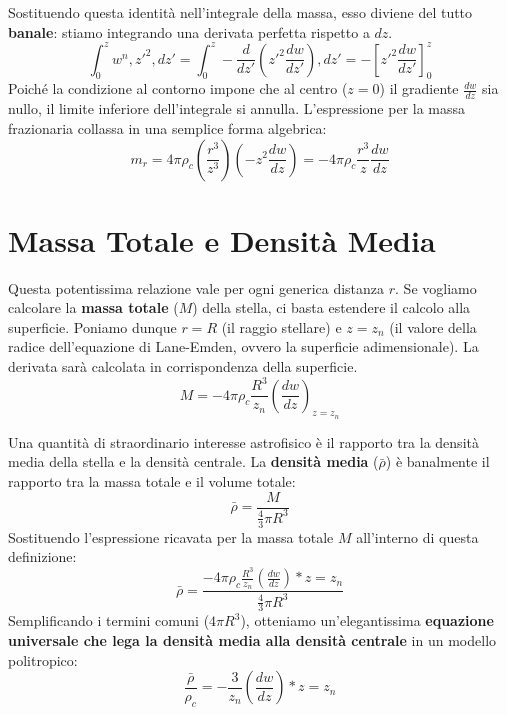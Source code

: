 Sostituendo questa identità nell'integrale della massa, esso diviene del tutto \textbf{banale}: stiamo integrando una derivata perfetta rispetto a $dz$.
\begin{equation}
\int_0^z w^n , z'^2 , dz' = \int_0^z - \frac{d}{dz'} \left( z'^2 \frac{dw}{dz'} \right) , dz' = - \left[ z'^2 \frac{dw}{dz'} \right]_0^z
\end{equation}
Poiché la condizione al contorno impone che al centro ($z=0$) il gradiente $\frac{dw}{dz}$ sia nullo, il limite inferiore dell'integrale si annulla. L'espressione per la massa frazionaria collassa in una semplice forma algebrica:
\begin{equation}
m_r = 4\pi \rho_c \left( \frac{r^3}{z^3} \right) \left( - z^2 \frac{dw}{dz} \right) = - 4\pi \rho_c \frac{r^3}{z} \frac{dw}{dz}
\end{equation}

\section{Massa Totale e Densità Media}

Questa potentissima relazione vale per ogni generica distanza $r$.
Se vogliamo calcolare la \textbf{massa totale} ($M$) della stella, ci basta estendere il calcolo alla superficie.
Poniamo dunque $r = R$ (il raggio stellare) e $z = z_n$ (il valore della radice dell'equazione di Lane-Emden, ovvero la superficie adimensionale).
La derivata sarà calcolata in corrispondenza della superficie.
\begin{equation}
M = - 4\pi \rho_c \frac{R^3}{z_n} \left( \frac{dw}{dz} \right)_{z=z_n}
\end{equation}

Una quantità di straordinario interesse astrofisico è il rapporto tra la densità media della stella e la densità centrale.
La \textbf{densità media} ($\bar{\rho}$) è banalmente il rapporto tra la massa totale e il volume totale:
\begin{equation}
\bar{\rho} = \frac{M}{\frac{4}{3}\pi R^3}
\end{equation}
Sostituendo l'espressione ricavata per la massa totale $M$ all'interno di questa definizione:
\begin{equation}
\bar{\rho} = \frac{- 4\pi \rho_c \frac{R^3}{z_n} \left( \frac{dw}{dz} \right)*{z=z_n}}{\frac{4}{3}\pi R^3}
\end{equation}
Semplificando i termini comuni ($4\pi R^3$), otteniamo un'elegantissima \textbf{equazione universale che lega la densità media alla densità centrale} in un modello politropico:
\begin{equation}
\frac{\bar{\rho}}{\rho_c} = - \frac{3}{z_n} \left( \frac{dw}{dz} \right)*{z=z_n}
\end{equation}

